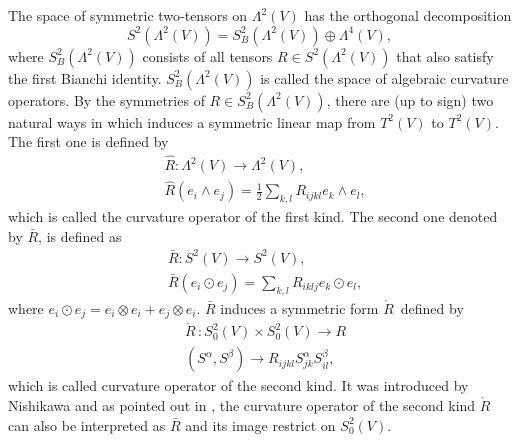 \documentclass[11pt, reqno]{amsart}
\numberwithin{equation}{section}
\theoremstyle{definition}
\begin{document}
	The space of symmetric two-tensors on ${{\Lambda }^{2}}(V)$ has the orthogonal decomposition
	\[S^2({\Lambda }^2(V))=S_{B}^2({\Lambda }^2(V))\oplus {\Lambda }^4(V),\]
	where $S_{B}^{2}({\Lambda }^2(V))$ consists of all tensors $R\in S^2({\Lambda }^2(V))$ that also satisfy the first Bianchi identity. $S_{B}^2({\Lambda }^2(V))$ is called the space of algebraic curvature operators.
	By the symmetries of $R\in S_{B}^{2}({{\Lambda }^{2}}(V))$, there are (up to sign) two natural ways in which induces a symmetric linear map from $T^2(V)$ to $T^2(V)$.
	The first one is defined by
	\begin{align*}
		& \hat{R}:{{\Lambda }^{2}}(V)\to {{\Lambda }^{2}}(V), \\ 
		& \hat{R}({{e}_{i}}\wedge {{e}_{j}})=\frac{1}{2}\sum\limits_{k,l}{{{R}_{ijkl}}{{e}_{k}}\wedge {{e}_{l}}}, 
	\end{align*}
	which is called the curvature operator of the first kind.
	The second one denoted by $\bar{R}$, is defined as
	\begin{align*}
		& \bar{R}:{{S}^{2}}(V)\to {{S}^{2}}(V), \\ 
		& \bar{R}({{e}_{i}}\odot {{e}_{j}})=\sum\limits_{k,l}{{{R}_{iklj}}{{e}_{k}}\odot {{e}_{l}}}, 
	\end{align*}
	where $e_i\odot e_j=e_i\otimes e_i+e_j\otimes e_i.$ $\bar{R}$ induces a symmetric form $\mathring{R}\,$ defined by
	\begin{align*}
		& \mathring{R}\,:S_{0}^{2}(V)\times S_{0}^{2}(V)\to R \\ 
		& ({{S}^{\alpha }},{{S}^{\beta }})\to {{R}_{ijkl}}S_{jk}^{\alpha }S_{il}^{\beta },  
	\end{align*}
	which is called curvature operator of the second kind. It was introduced by Nishikawa \cite{Ni} and as pointed out in \cite{NP}, the curvature operator of the second kind $\mathring{R}\,$ can also be interpreted as $\bar{R}$ and its image restrict on $S_{0}^{2}(V)$.
	
\end{document}
